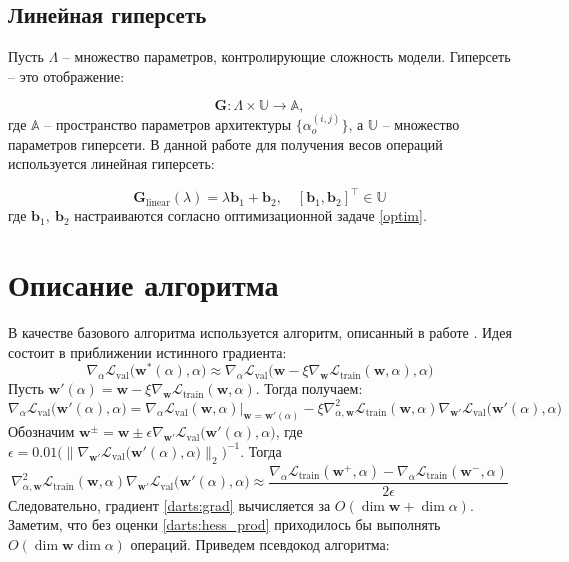 \documentclass[12pt, twoside]{article}
\begin{document}
\subsection{Линейная гиперсеть}

Пусть $\Lambda$ --  множество параметров, контролирующие сложность модели. Гиперсеть -- это отображение:

\begin{equation}
	\mathbf{G} : \Lambda \times \mathbb{U} \rightarrow \mathbb{A},
\end{equation}
где $\mathbb{A}$ -- пространство параметров архитектуры $\{\alpha^{(i, j)}_o\}$, а $\mathbb{U}$ -- множество параметров гиперсети.
В данной работе для получения весов операций используется линейная гиперсеть:
 
 \begin{equation}\label{hypernet}
 \mathbf{G}_{\text{linear}}(\lambda) = \lambda \mathbf{b}_1 + \mathbf{b}_2, \quad [\mathbf{b}_1, \mathbf{b}_2]^\top \in \mathbb{U}
 \end{equation}
 где $\mathbf{b}_1, ~\mathbf{b}_2$  настраиваются согласно оптимизационной задаче \eqref{optim}.

\section{Описание алгоритма}
 В качестве базового алгоритма используется алгоритм, описанный в работе \cite{journals/corr/abs-1806-09055}. Идея состоит в приближении истинного градиента:
$$\nabla_\alpha\mathcal{L}_\text{val}\bigl(\mathbf{w}^*(\alpha), \alpha\bigr) \approx \nabla_\alpha\mathcal{L}_\text{val} \bigl( \mathbf{w} - \xi\nabla_\mathbf{w}\mathcal{L}_\text{train}(\mathbf{w}, \alpha), \alpha \bigr)$$
Пусть $\mathbf{w}'(\alpha) = \mathbf{w} - \xi\nabla_\mathbf{w}\mathcal{L}_\text{train}(\mathbf{w}, \alpha)$. Тогда получаем:
\begin{equation}
\label{darts:grad}
\nabla_\alpha\mathcal{L}_\text{val}\bigl(\mathbf{w}'(\alpha), \alpha\bigr) = \nabla_\alpha\mathcal{L}_\text{val}(\mathbf{w}, \alpha)\big|_{\mathbf{w} = \mathbf{w}'(\alpha)} - \xi\nabla^2_{\alpha, \mathbf{w}}\mathcal{L}_\text{train}(\mathbf{w}, \alpha)\nabla_\mathbf{w'}\mathcal{L}_\text{val}\bigl(\mathbf{w}'(\alpha), \alpha\bigr)
\end{equation}
Обозначим $\mathbf{w}^{\pm} = \mathbf{w}\pm\epsilon\nabla_\mathbf{w'}\mathcal{L}_\text{val}\bigl(\mathbf{w}'(\alpha), \alpha\bigr)$, где $\epsilon = 0.01\bigl(\|\nabla_\mathbf{w'}\mathcal{L}_\text{val}\bigl(\mathbf{w}'(\alpha), \alpha\bigr)\|_2\bigr)^{-1}$.
Тогда
\begin{equation}
\label{darts:hess_prod}
\nabla^2_{\alpha, \mathbf{w}}\mathcal{L}_\text{train}(\mathbf{w}, \alpha)\nabla_\mathbf{w'}\mathcal{L}_\text{val}\bigl(\mathbf{w}'(\alpha), \alpha\bigr) \approx \frac{\nabla_\alpha\mathcal{L}_\text{train}(\mathbf{w}^+, \alpha) - \nabla_\alpha\mathcal{L}_\text{train}(\mathbf{w}^-, \alpha)}{2\epsilon}
\end{equation}
Следовательно, градиент \eqref{darts:grad} вычисляется за $O(\dim\mathbf{w} + \dim\alpha)$. Заметим, что без оценки \eqref{darts:hess_prod} приходилось бы выполнять $O(\dim\mathbf{w}\dim\alpha)$ операций. Приведем псевдокод алгоритма:
\end{document}
